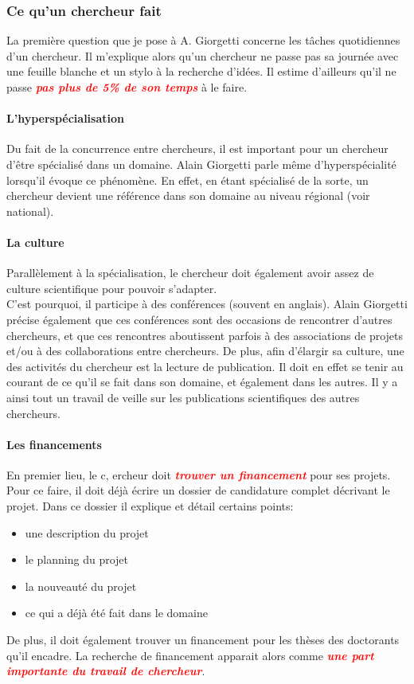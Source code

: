 \documentclass[a4paper,12pt, draft]{report}
\newcommand{\badPoint}[1]{\textcolor{red}{\textbf{\textit{#1}}}}
\begin{document}
\subsubsection{Ce qu'un chercheur fait} La première question que je pose à A. Giorgetti concerne les tâches quotidiennes d'un chercheur. Il m'explique alors qu'un chercheur ne passe pas sa journée avec une feuille blanche et un stylo à la recherche d'idées. Il estime d'ailleurs qu'il ne passe \badPoint{pas plus de 5\% de son temps} à le faire.

\paragraph{L'hyperspécialisation}
Du fait de la concurrence entre chercheurs, il est important pour un chercheur d'être spécialisé dans un domaine. Alain Giorgetti parle même d'hyperspécialité lorsqu'il évoque ce phénomène. En effet, en étant spécialisé de la sorte, un chercheur devient une référence dans son domaine au niveau régional (voir national).

\paragraph{La culture}
Parallèlement à la spécialisation, le chercheur doit également avoir assez de culture scientifique pour pouvoir s'adapter. 
\\C'est pourquoi, il participe à des conférences (souvent en anglais). Alain Giorgetti précise également que ces conférences sont des occasions de rencontrer d'autres chercheurs, et que ces rencontres aboutissent parfois à des associations de projets et/ou à des collaborations entre chercheurs.
De plus, afin d'élargir sa culture, une des activités du chercheur est la lecture de publication. Il doit en effet se tenir au courant de ce qu'il se fait dans son domaine, et également dans les autres. Il y a ainsi tout un travail de veille sur les publications scientifiques des autres chercheurs.


\paragraph{Les financements}
En premier lieu, le c, ercheur doit \badPoint{trouver un financement} pour ses projets. Pour ce faire, il doit déjà écrire un dossier de candidature complet décrivant le projet. Dans ce dossier il explique et détail certains points:
\begin{itemize}
\item une description du projet
\item le planning du projet
\item la nouveauté du projet
\item ce qui a déjà été fait dans le domaine
\end{itemize}
De plus, il doit également trouver un financement pour les thèses des doctorants qu'il encadre.
La recherche de financement apparait alors comme \badPoint{une part importante du travail de chercheur}.
\end{document}
